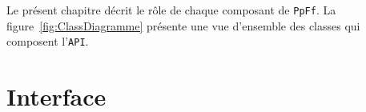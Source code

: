 Le pr\'esent chapitre d\'ecrit le r\^ole de chaque composant de
\texttt{PpFf}. La figure~\ref{fig:ClassDiagramme} pr\'esente une vue
d'ensemble des classes qui composent l'\texttt{API}.


%
%
%
%


%

\section{Interface}


